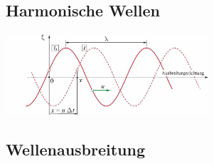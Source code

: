 \subsection{Harmonische Wellen}
\begin{center}
	\begin{minipage}{0.2\textwidth}
		
	\end{minipage}%
	\begin{minipage}{0.3\textwidth}
		\includegraphics[height=3cm,keepaspectratio=true]{Images/harmonische_welle.png}
	\end{minipage}
\end{center}




\subsection{Wellenausbreitung}

